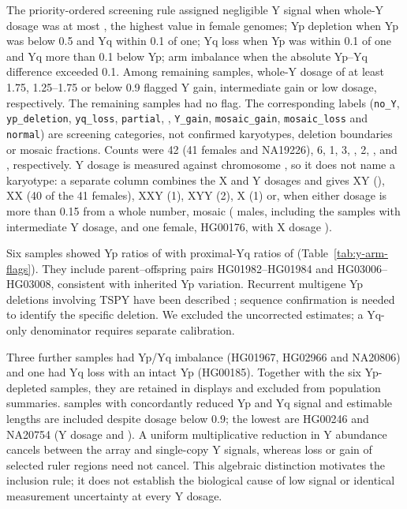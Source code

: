 The priority-ordered screening rule assigned negligible Y signal when whole-Y dosage was at most , the highest value in  female genomes; Yp depletion when Yp was below 0.5 and Yq within 0.1 of one; Yq loss when Yp was within 0.1 of one and Yq more than 0.1 below Yp; arm imbalance when the absolute Yp--Yq difference exceeded 0.1. Among remaining samples, whole-Y dosage of at least 1.75, 1.25--1.75 or below 0.9 flagged Y gain, intermediate gain or low dosage, respectively. The remaining samples had no flag. The corresponding labels (\texttt{no\_Y}, \texttt{yp\_deletion}, \texttt{yq\_loss}, \texttt{partial}, , \texttt{Y\_gain}, \texttt{mosaic\_gain}, \texttt{mosaic\_loss} and \texttt{normal}) are screening categories, not confirmed karyotypes, deletion boundaries or mosaic fractions. Counts were 42 (41 females and NA19226), 6, 1, 3, , 2, ,  and , respectively. Y dosage is measured against chromosome , so it does not name a karyotype: a separate column combines the X and Y dosages and gives XY (), XX (40 of the 41 females), XXY (1), XYY (2), X (1) or, when either dosage is more than 0.15 from a whole number, mosaic ( males, including the samples with intermediate Y dosage, and one female, HG00176, with X dosage ).

Six samples showed Yp ratios of  with proximal-Yq ratios of  (Table~\ref{tab:y-arm-flags}). They include parent--offspring pairs HG01982--HG01984 and HG03006--HG03008, consistent with inherited Yp variation. Recurrent multigene Yp deletions involving TSPY have been described \cite{Jobling2007}; sequence confirmation is needed to identify the specific deletion.  We excluded the uncorrected estimates; a Yq-only denominator requires separate calibration.

Three further samples had Yp/Yq imbalance (HG01967, HG02966 and NA20806) and one had Yq loss with an intact Yp (HG00185). Together with the six Yp-depleted samples, they are retained in displays and excluded from population summaries.  samples with concordantly reduced Yp and Yq signal and estimable lengths are included despite dosage below 0.9; the lowest are HG00246 and NA20754 (Y dosage  and ). A uniform multiplicative reduction in Y abundance cancels between the array and single-copy Y signals, whereas loss or gain of selected ruler regions need not cancel. This algebraic distinction motivates the inclusion rule; it does not establish the biological cause of low signal or identical measurement uncertainty at every Y dosage.

